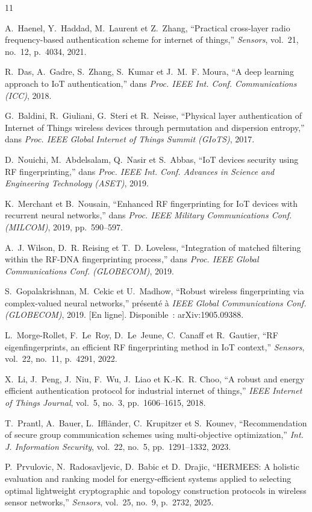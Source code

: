 \documentclass[conference]{IEEEtran}
\begin{document}
\begin{thebibliography}{11}

A.~Haenel, Y.~Haddad, M.~Laurent et Z.~Zhang, ``Practical cross-layer radio frequency-based authentication scheme for internet of things,'' \emph{Sensors}, vol.~21, no.~12, p.~4034, 2021.

R.~Das, A.~Gadre, S.~Zhang, S.~Kumar et J.~M.~F. Moura, ``A deep learning approach to IoT authentication,'' dans \emph{Proc. IEEE Int. Conf. Communications (ICC)}, 2018.

G.~Baldini, R.~Giuliani, G.~Steri et R.~Neisse, ``Physical layer authentication of Internet of Things wireless devices through permutation and dispersion entropy,'' dans \emph{Proc. IEEE Global Internet of Things Summit (GIoTS)}, 2017.

D.~Nouichi, M.~Abdelsalam, Q.~Nasir et S.~Abbas, ``IoT devices security using RF fingerprinting,'' dans \emph{Proc. IEEE Int. Conf. Advances in Science and Engineering Technology (ASET)}, 2019.

K.~Merchant et B.~Nousain, ``Enhanced RF fingerprinting for IoT devices with recurrent neural networks,'' dans \emph{Proc. IEEE Military Communications Conf. (MILCOM)}, 2019, pp.~590--597.

A.~J. Wilson, D.~R. Reising et T.~D. Loveless, ``Integration of matched filtering within the RF-DNA fingerprinting process,'' dans \emph{Proc. IEEE Global Communications Conf. (GLOBECOM)}, 2019.

S.~Gopalakrishnan, M.~Cekic et U.~Madhow, ``Robust wireless fingerprinting via complex-valued neural networks,'' présenté à \emph{IEEE Global Communications Conf. (GLOBECOM)}, 2019. [En ligne]. Disponible~: arXiv:1905.09388.

L.~Morge-Rollet, F.~Le~Roy, D.~Le~Jeune, C.~Canaff et R.~Gautier, ``RF eigenfingerprints, an efficient RF fingerprinting method in IoT context,'' \emph{Sensors}, vol.~22, no.~11, p.~4291, 2022.

X.~Li, J.~Peng, J.~Niu, F.~Wu, J.~Liao et K.-K.~R. Choo, ``A robust and energy efficient authentication protocol for industrial internet of things,'' \emph{IEEE Internet of Things Journal}, vol.~5, no.~3, pp.~1606--1615, 2018.

T.~Prantl, A.~Bauer, L.~Iffl\"ander, C.~Krupitzer et S.~Kounev, ``Recommendation of secure group communication schemes using multi-objective optimization,'' \emph{Int. J. Information Security}, vol.~22, no.~5, pp.~1291--1332, 2023.

P.~Prvulovic, N.~Radosavljevic, D.~Babic et D.~Drajic, ``HERMEES: A holistic evaluation and ranking model for energy-efficient systems applied to selecting optimal lightweight cryptographic and topology construction protocols in wireless sensor networks,'' \emph{Sensors}, vol.~25, no.~9, p.~2732, 2025.

\end{thebibliography}
\end{document}
